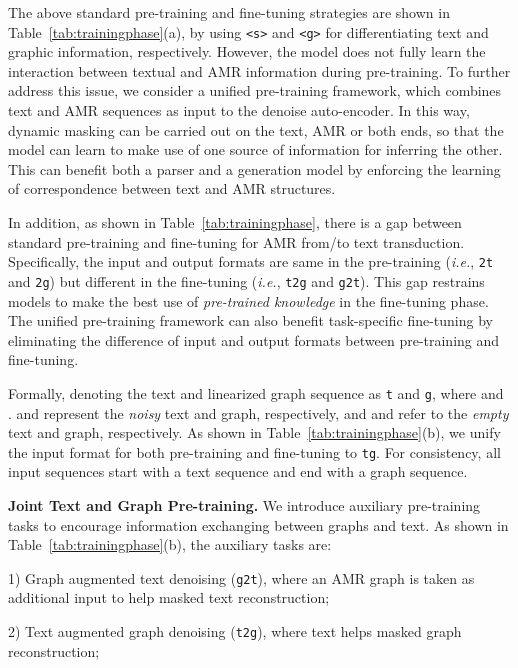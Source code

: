 \documentclass[11pt]{article}
\begin{document}
The above standard pre-training and fine-tuning strategies are shown in Table~\ref{tab:trainingphase}(a), 
by using \texttt{<s>} and \texttt{<g>} for differentiating text and graphic information, respectively.
However, the model does not fully learn the interaction between textual and AMR information during pre-training. 
To further address this issue, we consider a unified pre-training framework, which combines text and AMR sequences as input to the denoise auto-encoder. In this way, dynamic masking can be carried out on the text, AMR or both ends, so that the model can learn to make use of one source of information for inferring the other. This can benefit both a parser and a generation model by enforcing the learning of correspondence between text and AMR structures. 

In addition, as shown in Table~\ref{tab:trainingphase}, there is a gap between standard pre-training and fine-tuning for AMR from/to text transduction.
Specifically, the input and output formats are same in the pre-training (\textit{i.e.}, \texttt{2t} and \texttt{2g}) but different in the fine-tuning (\textit{i.e.}, \texttt{t2g} and \texttt{g2t}). 
This gap restrains models to make the best use of \emph{pre-trained knowledge} in the fine-tuning phase. 
The unified pre-training framework can also benefit task-specific fine-tuning by eliminating the difference of input and output formats between pre-training and fine-tuning. 

Formally, denoting the text and linearized graph sequence as \texttt{t} and \texttt{g}, where  and .
 and  represent the \textit{noisy} text and graph, respectively, and  and  refer to the \textit{empty} text and graph, respectively. 
As shown in Table~\ref{tab:trainingphase}(b), we unify the input format for both pre-training and fine-tuning to \texttt{tg}.
For consistency, all input sequences start with a text sequence and end with a graph sequence.



\noindent\textbf{Joint Text and Graph Pre-training.}
We introduce  auxiliary pre-training tasks to encourage information exchanging between graphs and text. 
As shown in Table~\ref{tab:trainingphase}(b), the auxiliary tasks are:

1) Graph augmented text denoising (\texttt{g2t}), where an AMR graph is taken as additional input to help masked text reconstruction; 

2) Text augmented graph denoising (\texttt{t}\texttt{2g}), where text helps masked graph reconstruction;
\end{document}
